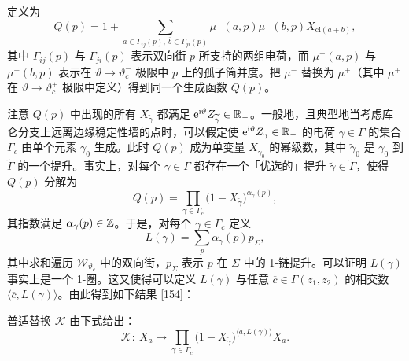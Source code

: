 定义为
\[
Q(p)=1+\sum_{\overline{a}\in\Gamma_{ij}(p),\ \overline{b}\in\Gamma_{ji}(p)}\mu^-(a,p)\mu^-(b,p)X_{\mathrm{cl}(a+b)},
\]
其中 $\Gamma_{ij}(p)$ 与 $\Gamma_{ji}(p)$ 表示双向街 $p$ 所支持的两组电荷，而 $\mu^-(a,p)$ 与 $\mu^-(b,p)$ 表示在 $\vartheta\to\vartheta_c^-$ 极限中 $p$ 上的孤子简并度。把 $\mu^-$ 替换为 $\mu^+$（其中 $\mu^+$ 在 $\vartheta\to\vartheta_c^+$ 极限中定义）得到同一个生成函数 $Q(p)$。

注意 $Q(p)$ 中出现的所有 $X_{\widetilde{\gamma}}$ 都满足 $\mathrm{e}^{\mathrm{i}\vartheta}Z_{\widetilde{\gamma}}\in\mathbb{R}_-$。一般地，且典型地当考虑库仑分支上远离边缘稳定性墙的点时，可以假定使 $\mathrm{e}^{\mathrm{i}\vartheta}Z_\gamma\in\mathbb{R}_-$ 的电荷 $\gamma\in\Gamma$ 的集合 $\Gamma_c$ 由单个元素 $\gamma_0$ 生成。此时 $Q(p)$ 成为单变量 $X_{\widetilde{\gamma}_0}$ 的幂级数，其中 $\widetilde{\gamma}_0$ 是 $\gamma_0$ 到 $\widetilde{\Gamma}$ 的一个提升。事实上，对每个 $\gamma\in\Gamma$ 都存在一个「优选的」提升 $\widetilde{\gamma}\in\widetilde{\Gamma}$，使得 $Q(p)$ 分解为
\[
Q(p)=\prod_{\gamma\in\Gamma_c}\big(1-X_{\widetilde{\gamma}}\big)^{\alpha_\gamma(p)},
\]
其指数满足 $\alpha_\gamma(p)\in\mathbb{Z}$。于是，对每个 $\gamma\in\Gamma_c$ 定义
\[
L(\gamma)=\sum_{p}\alpha_\gamma(p)p_\Sigma,
\]
其中求和遍历 $\mathcal{W}_{\vartheta_c}$ 中的双向街，$p_\Sigma$ 表示 $p$ 在 $\Sigma$ 中的 1-链提升。可以证明 $L(\gamma)$ 事实上是一个 1-圈。这又使得可以定义 $L(\gamma)$ 与任意 $\overline{c}\in\Gamma(z_1,z_2)$ 的相交数 $\langle\overline{c},L(\gamma)\rangle$。由此得到如下结果 [154]：

\begin{proposition}[22.28]
普适替换 $\mathcal{K}$ 由下式给出：
\[
\mathcal{K}:\ X_a\longmapsto \prod_{\gamma\in\Gamma_c}\big(1-X_{\widetilde{\gamma}}\big)^{\langle a,L(\gamma)\rangle}X_a.
\]
\end{proposition}


